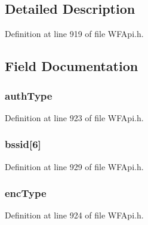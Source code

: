 \subsection{Detailed Description}


Definition at line 919 of file W\+F\+Api.\+h.



\subsection{Field Documentation}
\hypertarget{structt_w_f_wps_cred_ae7b1078616e49235da73a474e25781d7}{}
\subsubsection[{auth\+Type}]{ auth\+Type}\label{structt_w_f_wps_cred_ae7b1078616e49235da73a474e25781d7}


Definition at line 923 of file W\+F\+Api.\+h.

\hypertarget{structt_w_f_wps_cred_af1eb240ad4299a104d0bf3fddcabbb95}{}
\subsubsection[{bssid}]{ bssid\mbox{[}6\mbox{]}}\label{structt_w_f_wps_cred_af1eb240ad4299a104d0bf3fddcabbb95}


Definition at line 929 of file W\+F\+Api.\+h.

\hypertarget{structt_w_f_wps_cred_a5a5b9f2801805bd0ba066a58208e184b}{}
\subsubsection[{enc\+Type}]{ enc\+Type}\label{structt_w_f_wps_cred_a5a5b9f2801805bd0ba066a58208e184b}


Definition at line 924 of file W\+F\+Api.\+h.

\hypertarget{structt_w_f_wps_cred_ac9a3449850cd1bfbfdd89840686f2313}{}

